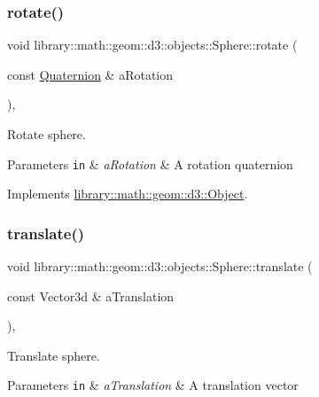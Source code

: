 \subsubsection{\texorpdfstring{rotate()}{rotate()}}
{\footnotesize\ttfamily void library\+::math\+::geom\+::d3\+::objects\+::\+Sphere\+::rotate (\begin{DoxyParamCaption}\item[{const \hyperlink{classlibrary_1_1math_1_1geom_1_1trf_1_1rot_1_1_quaternion}{Quaternion} \&}]{a\+Rotation }\end{DoxyParamCaption})\hspace{0.3cm}{\ttfamily [override]}, {\ttfamily [virtual]}}



Rotate sphere. 


\begin{DoxyParams}[1]{Parameters}
\mbox{\tt in}  & {\em a\+Rotation} & A rotation quaternion \\
\hline
\end{DoxyParams}


Implements \hyperlink{classlibrary_1_1math_1_1geom_1_1d3_1_1_object_aabefebc4960530ce6356c4445c5d490e}{library\+::math\+::geom\+::d3\+::\+Object}.

\mbox{\label{classlibrary_1_1math_1_1geom_1_1d3_1_1objects_1_1_sphere_af2a22ab0dc9331bddf358a9c24f8e7cf}} 
\subsubsection{\texorpdfstring{translate()}{translate()}}
{\footnotesize\ttfamily void library\+::math\+::geom\+::d3\+::objects\+::\+Sphere\+::translate (\begin{DoxyParamCaption}\item[{const Vector3d \&}]{a\+Translation }\end{DoxyParamCaption})\hspace{0.3cm}{\ttfamily [override]}, {\ttfamily [virtual]}}



Translate sphere. 


\begin{DoxyParams}[1]{Parameters}
\mbox{\tt in}  & {\em a\+Translation} & A translation vector \\
\hline
\end{DoxyParams}


